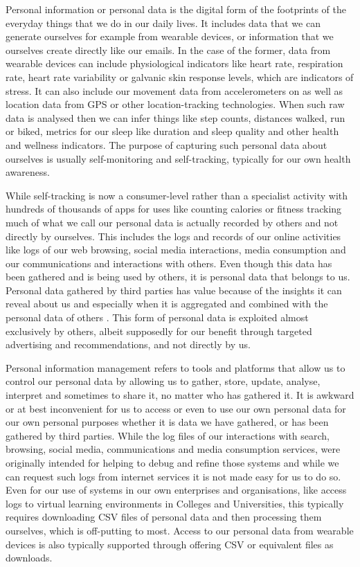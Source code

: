 \documentclass[11pt]{article}
\begin{document}
Personal information or personal data is the digital form of the footprints of the everyday things that we do in our daily lives. It includes data that we can generate ourselves for example from wearable devices, or information that we ourselves create directly like our emails. In the case of the former, data from wearable devices can include physiological indicators like heart rate, respiration rate, heart rate variability or galvanic skin response levels, which are indicators of stress.  It can also include our movement data from accelerometers on as well as location data from GPS or other location-tracking technologies.  When such raw data is analysed then we can infer things like step counts, distances walked, run or biked, metrics for our sleep like duration and sleep quality and other health and wellness indicators. The purpose of capturing such personal data about ourselves is usually self-monitoring and self-tracking, typically for our own health awareness.    

While self-tracking is now a consumer-level rather than a specialist activity with hundreds of thousands of apps for uses like counting calories or fitness tracking  \cite{lupton2017self} much of what we call our personal data is actually recorded by others and not directly by ourselves. This includes the logs and records of our online activities like logs of our web browsing, social media interactions, media consumption and our communications and interactions with others.   Even though this data has been gathered and is being used by others, it is personal data that belongs to us.
Personal data gathered by third parties has value because of the insights it can reveal about us  and especially when it is aggregated and combined with the personal data of others \cite{birch2021data}. This form of personal data is exploited almost exclusively  by others, albeit supposedly for our benefit through targeted advertising and recommendations, and not directly by us.

Personal information management refers to  tools and platforms that allow us to control our personal data by allowing us to gather, store, update, analyse, interpret and sometimes to share it, no matter who has gathered it.
It is awkward or at best inconvenient for us to access or even to use our own personal data for our own personal purposes whether it is data we have gathered, or has been gathered by third parties.
While the log files of our interactions with search, browsing, social media, communications and media consumption services, were originally intended for helping to  debug and refine those systems and while we can request such logs from internet services it is not made easy for us to do so. Even for our use of systems in our own enterprises and organisations, like access logs to virtual learning environments in Colleges and Universities, this  typically requires downloading CSV files of personal data and then processing them ourselves, which is off-putting to most.  Access to our personal data from wearable devices is also typically supported through offering CSV or equivalent files as downloads. 
\end{document}
